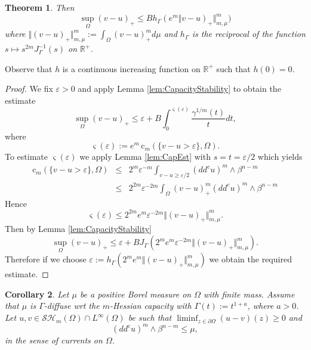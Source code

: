 \documentclass[12pt]{amsart}
\newtheorem{theorem}{Theorem}
\newtheorem{corollary}[theorem]{Corollary}
\theoremstyle{definition}
\numberwithin{theorem}{section}
\numberwithin{equation}{section}
\newcommand{\R}{\mathbb{R}}
\begin{document}
{\begin{theorem}
 Then
 $$
 \sup_{\Omega} (v-u)_+ \leq B h_\Gamma  (e^m \Vert v - u)_+\Vert_{m,\mu}^m)
 $$
 where $\Vert (v - u)_+\Vert_{m,\mu}^m := \int_\Omega  (v - u)_+^m d \mu$ and $h_\Gamma$ is the reciprocal  of the  function $s \longmapsto s^{2m}  J_\Gamma^{-1} (s)$ on $\R^+$.
\end{theorem}
Observe that $h$ is a continuous increasing  function on $\R^+$ such that $h(0) = 0$. 
\begin{proof}  We fix $\varepsilon > 0$ and apply Lemma \ref{lem:CapacityStability} to obtain the estimate
$$
\sup_{\Omega}(v-u)_+ \leq\varepsilon+ B \int_0^{ \varsigma (\varepsilon)} \frac{\gamma^{1 \slash m}  (t)}{t} d t,
$$
where
$$
\varsigma (\varepsilon) := e^m   \, \mathrm{c} _{m} (\{v - u>\varepsilon\}, \Omega).
$$
To estimate $\varsigma (\varepsilon)$ we apply  Lemma \ref{lem:CapEst} with $s = t = \varepsilon \slash 2$ which yields
\begin{eqnarray}
\mathrm{c} _{m} (\{v - u>\varepsilon\}, \Omega)&\leq& 2^m \varepsilon^{-m} \int_{v - u \geq \varepsilon\slash 2} (dd^c u)^m \wedge \beta^{n-m} \nonumber \\
&\leq & 2^{2 m} \varepsilon^{-2 m} \int_\Omega (v - u)_+^m (dd^c u)^m \wedge \beta^{n-m}
\end{eqnarray}
Hence
$$
\varsigma (\varepsilon) \leq 2^{2 m}  e^m \varepsilon^{-2 m } \Vert (v - u)_+\Vert_{m,\mu}^m.
$$
Then by Lemma \ref{lem:CapacityStability}  
$$
\sup_{\Omega}(v-u)_+ \leq \varepsilon+ B J_\Gamma \left( 2^m e^m \varepsilon^{-2 m} \Vert (v - u)_+\Vert_{m,\mu}^m\right).
$$
Therefore if we choose $\varepsilon := h_\Gamma(2^m e^m  \Vert (v - u)_+\Vert_{m,\mu}^m)$ we obtain the required estimate.
\end{proof}


\begin{corollary} Let  $\mu$ be a positive  Borel measure on $\Omega$ with finite mass. Assume that $\mu$ is $\Gamma$-diffuse  wrt the $m$-Hessian capacity with $\Gamma (t) := t^{1 + a}$, where $a > 0$.
Let   $u, v\in \mathcal{SH}_m (\Omega) \cap L^{\infty} (\Omega)$ be  such that $ \liminf_{z\in\partial\Omega}(u-v)(z)\geq 0 $ and
$$
 (dd^c u)^m \wedge \beta^{n-m} \leq \mu,
$$
 in the sense of currents on $\Omega$. 
 

\end{corollary}}
\end{document}
